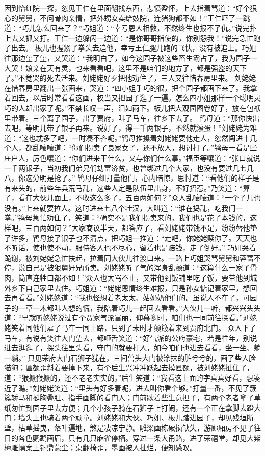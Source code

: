 \documentclass[12pt,oneside]{book}
\begin{document}
因到怡红院一探，忽见王仁在里面翻找东西，悲愤盈怀，上去指着骂道：“好个狠心的舅舅，不问骨肉亲情，把外甥女卖给妓院，连猪狗都不如！”王仁吓了一跳道：“巧儿怎么回来了？”巧姐道：“幸亏恩人相救，不然终生也报不了仇。”说完扑上去又抓又打。王仁一边躲闪一边道：“是你哥哥指使的，你别怨我！”说完急忙跑了出去。
板儿也握紧了拳头去追他，幸亏王仁腿儿跑的飞快，没有被追上。巧姐往那边望了望，又哭道：“我明白了，如今这园子被这些畜生霸占了，我为园子一大哭！娘亲在天有灵，也来看看吧，这里不是咱们的地方了，都是强盗的天下了。”不觉哭的死去活来。刘姥姥好歹把他劝住了，三人又往惜春房里来。
刘姥姥在惜春房里翻出一张画来，哭道：“四小姐手巧的很，把个园子都画下来了。我拿着回去，以后时常看看这画，权当又把园子逛了一遍。怎么四小姐那样一个聪明灵巧的人却出家了呢。”不禁长叹一声，泪如雨下。板儿把大观园图卷好了，放在包袱里带着。三个离了园子，出了贾府，叫了马车，往乡下去了。
鸨母道：“那你快出去吧，等明儿带了银子再来。说好了，得一千两银子，不然就滚蛋！”刘姥姥为难道：“这也忒多了吧，一时凑不齐呢。”鸨母推搡着刘姥姥要他走人，忽然闯进十几个人，都乱嚷嚷道：“你们拐卖了良家女子，还不放人，想讨打了。”鸨母一看是些庄户人，厉色嚷道：“你们进来干什么，又与你们什么事。”福臣等嚷道：“张口就说一千两银子，当初我们弟兄们劫富济贫，也曾绑过几个大家，也没有要过几七几八，你这分明是抢了。”
鸨母仔细打量他们，心内暗惊，思忖道：“看他们的样子是有来头的，前些年兵荒马乱，这些人定是队伍里出身，不好招惹。”乃笑道：“算了，看在大伙儿面上，不收这么多了，五百两如何？”众人乱嚷嚷道：“一个子儿也没有。”上来就要拉人。这时进来七八个壮汉，大叫道：“谁在捣乱，吃我们一拳。”鸨母急忙劝住了，笑道：“确实不是我们拐卖来的，我们也是花了本钱的，这样吧，三百两如何？”大家商议半天，都答应了，看刘姥姥带钱不足，纷纷替他垫了许多，鸨母接了银子也不清点，把巧姐一推道：“走吧，你姥姥赎你了。天天也不听话，使也使不动，服侍客人也不尽心，留着也是赔钱，走了倒好。”
巧姐哭着跪谢，被刘姥姥急忙扶起，拉着同大伙儿往渡口来。一路上巧姐哭骂舅舅和蓉蔷不停，说自己是被狠舅奸兄所卖。刘姥姥听了气的浑身乱颤道：“这算什么一家子骨肉，简直连牲口都不如！”众人也大骂不止，又带他到饭铺里吃了饭，要带他到城外乡下自己家里去住。巧姐道：“姥姥恩情终生难报，只是孙女惦记着家里，想回去再看看。”刘姥姥道：“我也怪想着老太太、姑奶奶他们的。虽说人不在了，可园子的一草一木都叫人想的慌，我陪着巧儿一起回去看看。”大伙儿一听，都兴兴头头道：“早就听姥姥说过有个贾家气派富丽，仰慕多时，咱们也一同前往探看。”刘姥姥笑着同他们雇了马车一同上路，只到了未时才颠簸着来到贾府北门。
众人下了马车，有说有笑往大门望去，都咂舌笑道：“好气派的公府豪宅，若是往年，别说进去逛逛了，探头往里头看，守门的就要打人，如今咱们也进去看看，坐一坐、躺一躺。”
只见荣府大门石狮子犹在，三间兽头大门被涂抹的脏兮兮的，画了些人脸猫狗；匾额歪斜着要掉下来，有个后生兴冲冲跃起去摸匾额，被刘姥姥扯住了，道：“猴撅猴撅的，还不老老实实的。”后生笑道：“我看这上面的字真真好看，想凑近了瞧。”刘姥姥笑道：“里头有好多着呢，进去叫你看个够。”打量一番，不见了簇簇轿马和挺胸叠肚、指手画脚的看门人；门前歇着些生意担子，有两个老者拿了草纸匆忙到园子里去方便；几个小孩子骑在石狮子上打闹，还有一个正在拿脚去蹬大门；墙头上也骑着两个顽童。刘姥姥和大伙、巧姐、板儿踏进园子，却见残垣断壁，枯草摇曳，落叶遍地，煞是凄凉宁静。雕梁画栋破损缺失，游廊厢房不见了往日的各色鹦鹉画眉，只有几只麻雀停栖。穿过一条大甬路，进了荣禧堂，却见大紫檀雕螭案上铜鼎蒙尘；桌翻椅歪，墨画被人扯烂，便知感叹。
\end{document}
